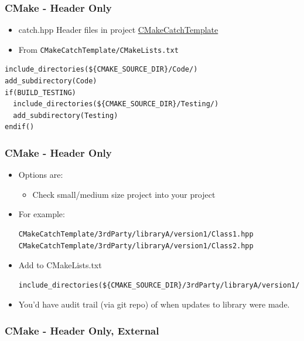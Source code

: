 \subsubsection{CMake - Header Only}\label{cmake---header-only}

\begin{itemize}
\itemsep1pt\parskip0pt
\item
  catch.hpp Header files in project
  \href{https://github.com/MattClarkson/CMakeCatchTemplate/blob/master/Testing/mpBasicTest.cpp}{CMakeCatchTemplate}
\item
  From \texttt{CMakeCatchTemplate/CMakeLists.txt}
\end{itemize}

\begin{verbatim}
include_directories(${CMAKE_SOURCE_DIR}/Code/)
add_subdirectory(Code)
if(BUILD_TESTING)
  include_directories(${CMAKE_SOURCE_DIR}/Testing/)
  add_subdirectory(Testing)
endif()
\end{verbatim}

\subsubsection{CMake - Header Only}\label{cmake---header-only-1}

\begin{itemize}
\item
  Options are:

  \begin{itemize}
  \itemsep1pt\parskip0pt
  \item
    Check small/medium size project into your project
  \end{itemize}
\item
  For example:

\begin{verbatim}
CMakeCatchTemplate/3rdParty/libraryA/version1/Class1.hpp
CMakeCatchTemplate/3rdParty/libraryA/version1/Class2.hpp
\end{verbatim}
\item
  Add to CMakeLists.txt

\begin{verbatim}
include_directories(${CMAKE_SOURCE_DIR}/3rdParty/libraryA/version1/)
\end{verbatim}
\item
  You'd have audit trail (via git repo) of when updates to library were
  made.
\end{itemize}

\subsubsection{CMake - Header Only,
External}\label{cmake---header-only-external}

